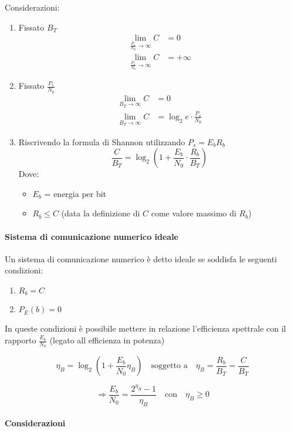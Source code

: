 \documentclass{article}
\begin{document}
Considerazioni:

\begin{enumerate}
  \item Fissato \( B_T \)
  \begin{align*}
    \lim_{\frac{P_s}{N_0} \to \infty} C &= 0 \\
    \lim_{\frac{P_s}{N_0} \to \infty} C &= +\infty
  \end{align*}

  \item Fissato \( \frac{P_s}{N_0} \)
  \begin{align*}
    \lim_{B_T \to \infty} C &= 0 \\
    \lim_{B_T \to \infty} C &= \log_2 e \cdot \frac{P_s}{N_0}
  \end{align*}

  \item Riscrivendo la formula di Shannon utilizzando \( P_s = E_b R_b \)
  \[
  \frac{C}{B_T} = \log_2 \left( 1 + \frac{E_b}{N_0} \cdot \frac{R_b}{B_T} \right)
  \]
  Dove:
  \begin{itemize}
    \item \( E_b \) = energia per bit
    \item \( R_b \leq C \) (data la definizione di \( C \) come valore massimo di \( R_b \))
  \end{itemize}
\end{enumerate}

\paragraph*{Sistema di comunicazione numerico ideale}
Un sistema di comunicazione numerico è detto ideale se soddisfa le seguenti condizioni:
\begin{enumerate}
  \item \( R_b = C \)
  \item \( P_E(b) = 0 \)
\end{enumerate}

In queste condizioni è possibile mettere in relazione l'efficienza spettrale con il rapporto \( \frac{E_b}{N_0} \) (legato all
efficienza in potenza)

\[
\eta_B = \log_2 \left( 1 + \frac{E_b}{N_0} \eta_B  \right) \quad \text{soggetto a} \quad  \eta_B = \frac{R_b}{B_T} = \frac{C}{B_T}
\]

\[
\Rightarrow \frac{E_b}{N_0} = \frac{2^{\eta_B} - 1}{\eta_B} \quad \text{con} \quad \eta_B \geq 0
\]


\paragraph*{Considerazioni}
\end{document}
